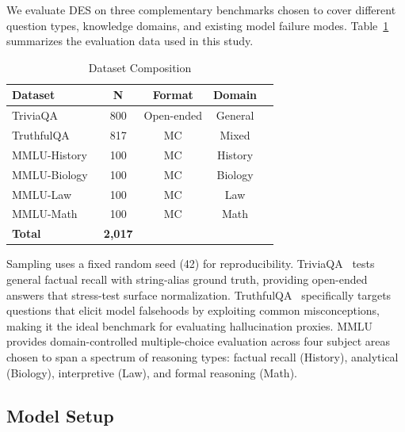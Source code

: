\documentclass[journal]{IEEEtran}
\begin{document}
We evaluate DES on three complementary benchmarks chosen to cover
different question types, knowledge domains, and existing model failure modes. Table~\ref{tab:datasets} summarizes the evaluation data used in this study.

\begin{table}[!t]
  \caption{Dataset Composition}
  \label{tab:datasets}
  \centering
  \begin{tabular}{lcccl}
    \toprule
    \textbf{Dataset} & \textbf{N} & \textbf{Format} & \textbf{Domain} \\
    \midrule
    TriviaQA~\cite{joshi2017triviaqa}    & 800  & Open-ended & General \\
    TruthfulQA~\cite{lin2022truthfulqa}  & 817  & MC         & Mixed \\
    MMLU-History~\cite{hendrycks2021mmlu}& 100  & MC         & History \\
    MMLU-Biology                         & 100  & MC         & Biology \\
    MMLU-Law                             & 100  & MC         & Law \\
    MMLU-Math                            & 100  & MC         & Math \\
    \midrule
    \textbf{Total}                       &\textbf{2,017}& & \\
    \bottomrule
  \end{tabular}
\end{table}

Sampling uses a fixed random seed (42) for reproducibility.
TriviaQA~\cite{joshi2017triviaqa} tests general factual recall with
string-alias ground truth, providing open-ended answers that stress-test
surface normalization.
TruthfulQA~\cite{lin2022truthfulqa} specifically targets questions that
elicit model falsehoods by exploiting common misconceptions, making it the
ideal benchmark for evaluating hallucination proxies.
MMLU~\cite{hendrycks2021mmlu} provides domain-controlled multiple-choice
evaluation across four subject areas chosen to span a spectrum of reasoning
types: factual recall (History), analytical (Biology), interpretive (Law),
and formal reasoning (Math).

\subsection{Model Setup}
\end{document}
